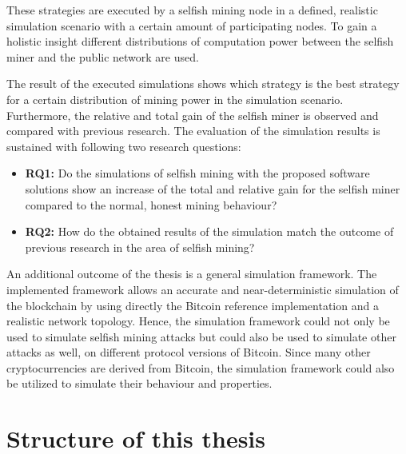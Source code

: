 These strategies are executed by a selfish mining node in a defined, realistic simulation scenario with a certain amount of participating nodes.
To gain a holistic insight different distributions of computation power between the selfish miner and the public network are used.

The result of the executed simulations shows which strategy is the best strategy for a certain distribution of mining power in the simulation scenario.
Furthermore, the relative and total gain of the selfish miner is observed and compared with previous research.
The evaluation of the simulation results is sustained with following two research questions:

\begin{itemize}
	\item \textbf{RQ1:} Do the simulations of selfish mining with the proposed software solutions show an increase of the total and relative gain for the selfish miner compared to the normal, honest mining behaviour?

	\item \textbf{RQ2:} How do the obtained results of the simulation match the outcome of previous research in the area of selfish mining?
\end{itemize}


An additional outcome of the thesis is a general simulation framework.
The implemented framework allows an accurate and near-deterministic simulation of the blockchain by using directly the Bitcoin reference implementation and a realistic network topology.
Hence, the simulation framework could not only be used to simulate selfish mining attacks but could also be used to simulate other attacks as well, on different protocol versions of Bitcoin. 
Since many other cryptocurrencies are derived from Bitcoin, the simulation framework could also be utilized to simulate their behaviour and properties.

\section{Structure of this thesis}


